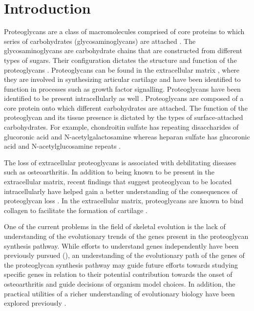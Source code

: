 \documentclass{article}
\begin{document}
\section{Introduction}
Proteoglycans are a class of macromolecules comprised of core proteins to which series of carbohydrates (glycosaminoglycans) are attached \cite{pg_struct_func}. The glycosaminoglycans are carbohydrate chains that are constructed from different types of sugars. Their configuration dictates the structure and function of the proteoglycans \cite{pg_chapter}. Proteoglycans can be found in the extracellular matrix \cite{pg_aggrecan}, where they are involved in synthesizing articular cartilage and have been identified to function in processes such as growth factor signalling. Proteoglycans have been identified to be present intracellularly as well \cite{pg_intro}. Proteoglycans are composed of a core protein onto which different carbohydrates are attached. The function of the proteoglycan and its tissue presence is dictated by the types of surface-attached carbohydrates. For example, chondroitin sulfate has repeating disaccharides of glucoronic acid and N-acetylgalactosamine whereas heparan sulfate has glucoronic acid and N-acetylglucosamine repeats \cite{pg_chapter}.

The loss of extracellular proteoglycans is associated with debilitating diseases such as osteoarthritis. In addition to being known to be present in the extracellular matrix, recent findings that suggest proteoglycan to be located intracellularly have helped gain a better understanding of the consequences of proteoglycan loss \cite{pg_intro, osteo1, proteo_osteo1}. In the extracellular matrix, proteoglycans are known to bind collagen to facilitate the formation of cartilage \cite{proteo_osteo2, proteo_osteo3}. 


One of the current problems in the field of skeletal evolution is the lack of understanding of the evolutionary trends of the genes present in the proteoglycan synthesis pathway. While efforts to understand genes independently have been previously pursued (\cite{fam20}), an understanding of the evolutionary path of the genes of the proteoglycan synthesis pathway may guide future efforts towards studying specific genes in relation to their potential contribution towards the onset of osteoarthritis and guide decisions of organism model choices. In addition, the practical utilities of a richer understanding of evolutionary biology have been explored previously \cite{evobio}.
\end{document}
